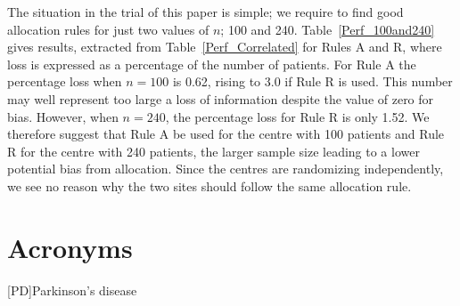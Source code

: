 \documentclass[number,12pt,review]{elsarticle}
\begin{document}
\begin{table}[ht]
\end{table}

The situation in the trial of this paper is simple; we require to find good allocation rules for just two values of $n$; 100 and 240. Table~\ref{Perf_100and240} gives results, extracted from Table~\ref{Perf_Correlated} for Rules A and R, where  loss is expressed as a percentage of the number of patients. For Rule A  the percentage loss when $n = 100$ is 0.62, rising to 3.0 if Rule R is used. This number may well represent too large a loss of information despite the value of zero for bias.
However, when $n = 240$, the percentage loss for Rule R is only 1.52. We therefore suggest that Rule A be used for the centre with 100 patients and Rule R for the centre with 240 patients, the larger sample size leading to a lower potential bias from allocation. Since the centres are randomizing
independently, we see no reason why the two sites should follow the same allocation rule.




\section{Acronyms}
\begin{acronym}
[PD]{Parkinson's disease}
\end{acronym}
\end{document}
